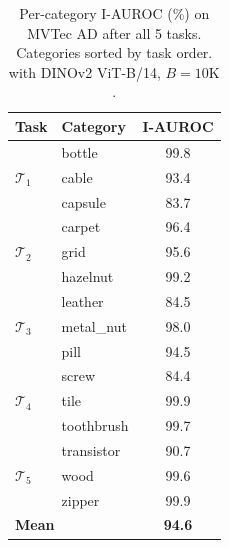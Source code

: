 \begin{table}[htbp]
\centering
\caption{Per-category I-AUROC (\%) on MVTec AD after all 5 tasks. Categories sorted by task order. \method{} with DINOv2 ViT-B/14, $B=10\text{K}$.}
\label{tab:per_category}
\begin{tabular}{llc}
\toprule
Task & Category & I-AUROC \\
\midrule
\multirow{3}{*}{$\mathcal{T}_1$} & bottle     & 99.8 \\
                                  & cable      & 93.4 \\
                                  & capsule    & 83.7 \\
\midrule
\multirow{3}{*}{$\mathcal{T}_2$} & carpet     & 96.4 \\
                                  & grid       & 95.6 \\
                                  & hazelnut   & 99.2 \\
\midrule
\multirow{3}{*}{$\mathcal{T}_3$} & leather    & 84.5 \\
                                  & metal\_nut & 98.0 \\
                                  & pill       & 94.5 \\
\midrule
\multirow{3}{*}{$\mathcal{T}_4$} & screw      & 84.4 \\
                                  & tile       & 99.9 \\
                                  & toothbrush & 99.7 \\
\midrule
\multirow{3}{*}{$\mathcal{T}_5$} & transistor & 90.7 \\
                                  & wood       & 99.6 \\
                                  & zipper     & 99.9 \\
\midrule
\multicolumn{2}{l}{\textbf{Mean}} & \textbf{94.6} \\
\bottomrule
\end{tabular}
\end{table}
